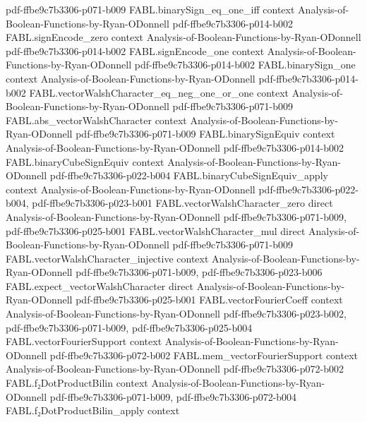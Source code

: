 \begin{theorem}
  {pdf-ffbe9c7b3306-p071-b009}
\proofstep
  {FABL.binarySign_eq_one_iff}
  {context}
  {Analysis-of-Boolean-Functions-by-Ryan-ODonnell}
  {pdf-ffbe9c7b3306-p014-b002}
\proofstep
  {FABL.signEncode_zero}
  {context}
  {Analysis-of-Boolean-Functions-by-Ryan-ODonnell}
  {pdf-ffbe9c7b3306-p014-b002}
\proofstep
  {FABL.signEncode_one}
  {context}
  {Analysis-of-Boolean-Functions-by-Ryan-ODonnell}
  {pdf-ffbe9c7b3306-p014-b002}
\proofstep
  {FABL.binarySign_one}
  {context}
  {Analysis-of-Boolean-Functions-by-Ryan-ODonnell}
  {pdf-ffbe9c7b3306-p014-b002}
\proofstep
  {FABL.vectorWalshCharacter_eq_neg_one_or_one}
  {context}
  {Analysis-of-Boolean-Functions-by-Ryan-ODonnell}
  {pdf-ffbe9c7b3306-p071-b009}
\proofstep
  {FABL.abs_vectorWalshCharacter}
  {context}
  {Analysis-of-Boolean-Functions-by-Ryan-ODonnell}
  {pdf-ffbe9c7b3306-p071-b009}
\proofstep
  {FABL.binarySignEquiv}
  {context}
  {Analysis-of-Boolean-Functions-by-Ryan-ODonnell}
  {pdf-ffbe9c7b3306-p014-b002}
\proofstep
  {FABL.binaryCubeSignEquiv}
  {context}
  {Analysis-of-Boolean-Functions-by-Ryan-ODonnell}
  {pdf-ffbe9c7b3306-p022-b004}
\proofstep
  {FABL.binaryCubeSignEquiv_apply}
  {context}
  {Analysis-of-Boolean-Functions-by-Ryan-ODonnell}
  {pdf-ffbe9c7b3306-p022-b004,
    pdf-ffbe9c7b3306-p023-b001}
\proofstep
  {FABL.vectorWalshCharacter_zero}
  {direct}
  {Analysis-of-Boolean-Functions-by-Ryan-ODonnell}
  {pdf-ffbe9c7b3306-p071-b009,
    pdf-ffbe9c7b3306-p025-b001}
\proofstep
  {FABL.vectorWalshCharacter_mul}
  {direct}
  {Analysis-of-Boolean-Functions-by-Ryan-ODonnell}
  {pdf-ffbe9c7b3306-p071-b009}
\proofstep
  {FABL.vectorWalshCharacter_injective}
  {context}
  {Analysis-of-Boolean-Functions-by-Ryan-ODonnell}
  {pdf-ffbe9c7b3306-p071-b009,
    pdf-ffbe9c7b3306-p023-b006}
\proofstep
  {FABL.expect_vectorWalshCharacter}
  {direct}
  {Analysis-of-Boolean-Functions-by-Ryan-ODonnell}
  {pdf-ffbe9c7b3306-p025-b001}
\proofstep
  {FABL.vectorFourierCoeff}
  {context}
  {Analysis-of-Boolean-Functions-by-Ryan-ODonnell}
  {pdf-ffbe9c7b3306-p023-b002,
    pdf-ffbe9c7b3306-p071-b009,
    pdf-ffbe9c7b3306-p025-b004}
\proofstep
  {FABL.vectorFourierSupport}
  {context}
  {Analysis-of-Boolean-Functions-by-Ryan-ODonnell}
  {pdf-ffbe9c7b3306-p072-b002}
\proofstep
  {FABL.mem_vectorFourierSupport}
  {context}
  {Analysis-of-Boolean-Functions-by-Ryan-ODonnell}
  {pdf-ffbe9c7b3306-p072-b002}
\proofstep
  {FABL.f₂DotProductBilin}
  {context}
  {Analysis-of-Boolean-Functions-by-Ryan-ODonnell}
  {pdf-ffbe9c7b3306-p071-b009,
    pdf-ffbe9c7b3306-p072-b004}
\proofstep
  {FABL.f₂DotProductBilin_apply}
  {context}

\end{theorem}
